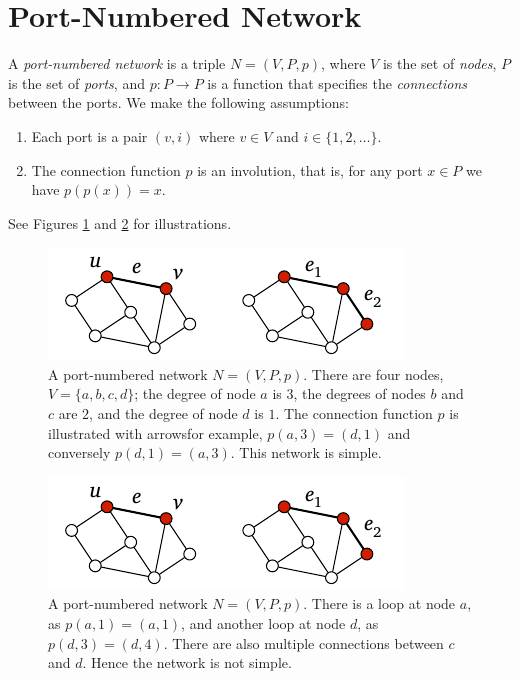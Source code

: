 \section{Port-Numbered Network}\label{sec:pnn}

A \emph{port-numbered network} is a triple $N = (V,P,p)$, where $V$ is the set of \emph{nodes}, $P$ is the set of \emph{ports}, and $p\colon P \to P$ is a function that specifies the \emph{connections} between the ports. We make the following assumptions:
\begin{enumerate}
    \item Each port is a pair $(v,i)$ where $v \in V$ and $i \in \{1,2,\dotsc\}$.
    \item The connection function $p$ is an involution, that is, for any port $x \in P$ we have $p(p(x)) = x$.
\end{enumerate}
See Figures \ref{fig:pnna} and \ref{fig:pnnb} for illustrations.
\begin{figure}
    \centering
    \includegraphics[page=\PPnnA]{figs.pdf}
    \caption{A port-numbered network $N = (V,P,p)$. There are four nodes, $V = \{a,b,c,d\}$; the degree of node $a$ is $3$, the degrees of nodes $b$ and $c$ are $2$, and the degree of node $d$ is $1$. The connection function $p$ is illustrated with arrows\mydash for example, $p(a,3) = (d,1)$ and conversely $p(d,1) = (a,3)$. This network is simple.}\label{fig:pnna}
\end{figure}
\begin{figure}
    \centering
    \includegraphics[page=\PPnnB]{figs.pdf}
    \caption{A port-numbered network $N = (V,P,p)$. There is a loop at node $a$, as $p(a,1) = (a,1)$, and another loop at node $d$, as $p(d,3) = (d,4)$. There are also multiple connections between $c$ and $d$. Hence the network is not simple.}\label{fig:pnnb}
\end{figure}

